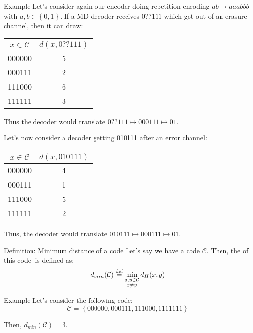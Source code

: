 \documentclass[a4paper]{article}
\begin{document}
\begin{parag}{Example}
    Let's consider again our encoder doing repetition encoding $ab \mapsto aaabbb$ with $a, b \in \left\{0, 1\right\}$. If a MD-decoder receives $0??111$ which got out of an erasure channel, then it can draw:
    \begin{center}
    \begin{tabular}{c|c}
        $x \in \mathcal{C}$ & $d\left(x, 0??111\right)$ \\
        \hline
        000000 & 5 \\
        000111 & 2 \\
        111000 & 6 \\
        111111 & 3
    \end{tabular}
    \end{center}

    Thus the decoder would translate $0??111 \mapsto 000111 \mapsto 01$.

    Let's now consider a decoder getting 010111 after an error channel:
    \begin{center}
    \begin{tabular}{c|c}
        $x \in \mathcal{C}$ & $d\left(x, 010111\right)$ \\
        \hline
        000000 & 4 \\
        000111 & 1 \\
        111000 & 5 \\
        111111 & 2
    \end{tabular}
    \end{center}

    Thus, the decoder would translate $010111 \mapsto 000111 \mapsto 01$.
\end{parag}


\begin{parag}{Definition: Minimum distance of a code}
    Let's say we have a code $\mathcal{C}$. Then, the  of this code, is defined as:
    \[d_{min}\left(\mathcal{C}\right) \over{=}{def} \min_{\substack{x, y \in \mathcal{C} \\ x \neq y}} d_H\left(x, y\right)\]

    \begin{subparag}{Example}
        Let's consider the following code:
        \[\mathcal{C} = \left\{000000, 000111, 111000, 1111111\right\}\]

        Then, $d_{min}\left(\mathcal{C}\right) = 3$.
    \end{subparag}
\end{parag}
\end{document}
